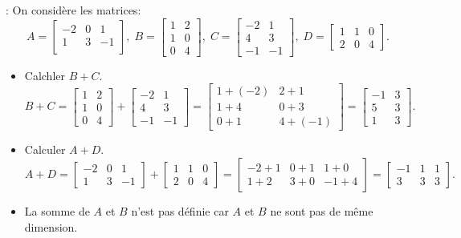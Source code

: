 \documentclass[12pt,a4paper]{book}
\numberwithin{definition}{chapter}
\theoremstyle{plain}
\begin{document}
\begin{example}: On considère les matrices: 
 \begin{equation*}
 A=
 \begin{bmatrix}
 -2 & 0 & 1\\
 1 & 3  & -1\\
 \end{bmatrix},\;
 B=
 \begin{bmatrix}
 1 & 2 \\
 1 & 0 \\
 0 & 4
 \end{bmatrix},\;
 C=
 \begin{bmatrix}
 -2 & 1 \\
 4 & 3 \\
 -1 & -1
 \end{bmatrix},\;
 D=
 \begin{bmatrix}
 1 & 1 & 0\\
 2 & 0 & 4
 \end{bmatrix}.
 \end{equation*}
 \begin{itemize}
 \item[\ding{43}] Calchler $B+C$.
 \begin{equation*}
 B+C=\begin{bmatrix}
 1 & 2 \\
 1 & 0 \\
 0 & 4
 \end{bmatrix}+
 \begin{bmatrix}
 -2 & 1 \\
 4 & 3 \\
 -1 & -1
 \end{bmatrix}=
 \begin{bmatrix}
 1+(-2) & 2+1 \\
 1+4 & 0+3 \\
 0+1 & 4+(-1)
 \end{bmatrix}=
 \begin{bmatrix}
 -1 & 3 \\
 5 & 3 \\
 1 & 3
 \end{bmatrix}.
 \end{equation*} 
 \item[\ding{43}] Calculer $A+D$.
 \begin{equation*}
 A+D=\begin{bmatrix}
 -2 & 0 & 1 \\
 1 & 3  & -1
 \end{bmatrix}+
 \begin{bmatrix}
 1 & 1 & 0\\
 2 & 0 & 4
 \end{bmatrix}=
 \begin{bmatrix}
 -2+1 & 0+1 & 1+0\\
 1+2 & 3+0 & -1+4
 \end{bmatrix}=
 \begin{bmatrix}
 -1 & 1 & 1\\
 3 & 3 & 3
 \end{bmatrix}.
 \end{equation*}
 \item[\ding{43}]  La somme de $A$ et $B$ n’est pas définie car $A$ et $B$ ne sont pas de même dimension.
 \end{itemize}
\end{example}
\end{document}
